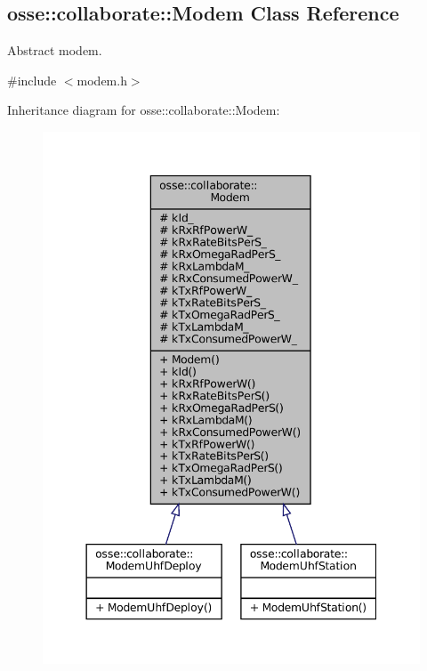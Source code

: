\hypertarget{classosse_1_1collaborate_1_1_modem}{}\subsection{osse\+:\+:collaborate\+:\+:Modem Class Reference}
\label{classosse_1_1collaborate_1_1_modem}


Abstract modem.  




{\ttfamily \#include $<$modem.\+h$>$}



Inheritance diagram for osse\+:\+:collaborate\+:\+:Modem\+:
\nopagebreak
\begin{figure}[H]
\begin{center}
\leavevmode
\includegraphics[width=344pt]{classosse_1_1collaborate_1_1_modem__inherit__graph}
\end{center}
\end{figure}
